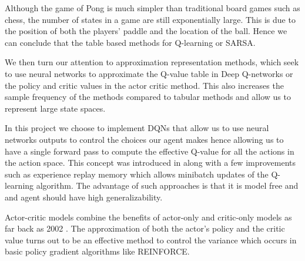 Although the game of Pong is much simpler than traditional board games such as chess, the number of states in a game are still exponentially large. This is due to the position of both the players' paddle and the location of the ball. Hence we can conclude that the table based methods for Q-learning or SARSA. 

\medskip
\noindent
We then turn our attention to approximation representation methods, which seek to use neural networks to approximate the Q-value table in Deep Q-networks or the policy and critic values in the actor critic method. This also increases the sample frequency of the methods compared to tabular methods and allow us to represent large state spaces.

\medskip
\noindent
In this project we choose to implement DQNs that allow us to use neural networks outputs to control the choices our agent makes hence allowing us to have a single forward pass to compute the effective Q-value for all the actions in the action space. This concept was introduced in \cite{Atari_Breakout} along with a few improvements such as experience replay memory which allows minibatch updates of the Q-learning algorithm. The advantage of such approaches is that it is model free and and agent should have high generalizability.

\medskip
\noindent
Actor-critic models combine the benefits of actor-only and critic-only models as far back as 2002 \cite{orig_a3c}. The approximation of both the actor's policy and the critic value turns out to be an effective method to control the variance which occurs in basic policy gradient algorithms like REINFORCE.  